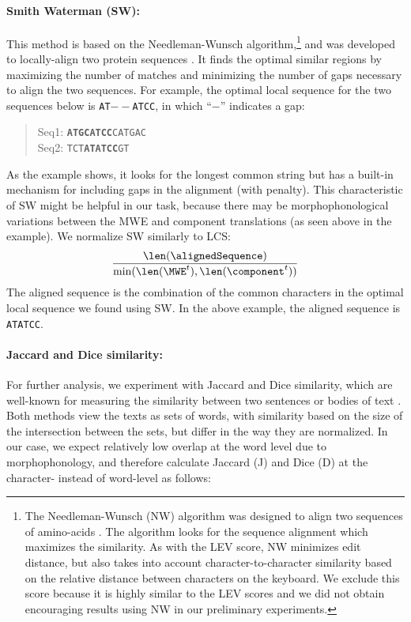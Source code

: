 \documentclass[output=paper,modfonts,nonflat]{langsci/langscibook}
\begin{document}
\paragraph*{Smith Waterman (SW):}
This method is based on the Needleman-Wunsch algorithm,\footnote{The
 Needleman-Wunsch (NW) algorithm was designed to align two sequences
 of amino-acids \citep{needleman1970}. The algorithm looks for the
 sequence alignment which maximizes the similarity. As with the LEV
 score, NW minimizes edit distance, but also takes into account
 character-to-character similarity based on the relative distance
 between characters on the keyboard. We exclude this score because
 it is highly similar to the LEV scores and we did not obtain
 encouraging results using NW in our preliminary experiments.} and
was developed to locally-align two protein sequences
\citep{smith1981}. It finds the optimal similar regions by maximizing
the number of matches and minimizing the number of gaps necessary to
align the two sequences. For example, the optimal local sequence for
the two sequences below is \texttt{AT$--$ATCC}, in which
``\texttt{$-$}'' indicates a gap:
\begin{quote}
Seq1: \texttt{\textbf{ATGCATCC}CATGAC}\\
Seq2: \texttt{TCT\textbf{ATATCC}GT}
\end{quote}
As the example shows, it looks for the longest common string but has a
built-in mechanism for including gaps in the alignment (with
penalty). This characteristic of SW might be helpful in our task,
because there may be morphophonological variations between the MWE and
component translations (as seen above in the 
example). We normalize SW similarly to LCS:
\begin{eqnarray}
\frac{\len(\alignedSequence)}{\min(\len(\MWE^t),\len(\component^t))}
\end{eqnarray}
The aligned sequence is the combination of the common characters in the
optimal local sequence we found using SW. In the above example, the
aligned sequence is \texttt{ATATCC}.



\paragraph*{Jaccard and Dice similarity:}
For further analysis, we experiment with Jaccard and Dice similarity,
which are well-known for measuring the similarity between two
sentences or bodies of text \citep{gomaa2013survey}.
Both methods view the texts as sets of words, with similarity based on
the size of the intersection between the sets, but differ in the
way they are normalized. In our case, we expect relatively low overlap
at the word level due to morphophonology, and therefore calculate
Jaccard (J) and Dice (D) at the character- instead of word-level as
follows:
\end{document}
